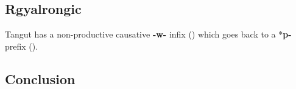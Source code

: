 \documentclass[oldfontcommands,oneside,a4paper,11pt]{article}
\newcommand{\ipa}[1]{\textbf{{\phon\mbox{#1}}}} %
\begin{document}
\subsection{Rgyalrongic}

Tangut has a non-productive causative \ipa{-w-} infix (\citealt{gong88alternations}) which goes back to a *\ipa{p-} prefix (\citealt[253-4]{jacques14esquisse}).

\citet{jacques15causative}
\citet{jackson14morpho}
\citet{jackson06paisheng}
\citet{lai13affixale}



 \subsection{Conclusion}
 
 
 


\end{document}
